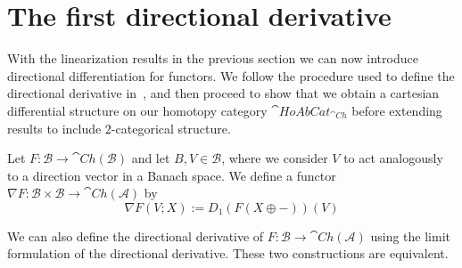 \section{The first directional derivative}

With the linearization results in the previous section we can now introduce directional differentiation for functors. We follow the procedure used to define the directional derivative in~\cite{BJORT}, and then proceed to show that we obtain a cartesian differential structure on our homotopy category $\cat{HoAbCat}_{\cat{Ch}}$ before extending results to include $2$-categorical structure.

\begin{defn}[label=defn:DirectionalDeriv]
    Let $F:\mathcal{B}\to \cat{Ch}(\mathcal{B})$ and let $B,V \in \mathcal{B}$, where we consider $V$ to act analogously to a direction vector in a Banach space. We define a functor $\nabla F:\mathcal{B}\times \mathcal{B}\to \cat{Ch}(\mathcal{A})$ by 
    \begin{equation*}
        \nabla F(V;X) := D_1(F(X\oplus -))(V)
    \end{equation*}
\end{defn}

We can also define the directional derivative of $F:\mathcal{B}\to \cat{Ch}(\mathcal{A})$ using the limit formulation of the directional derivative. These two constructions are equivalent.

